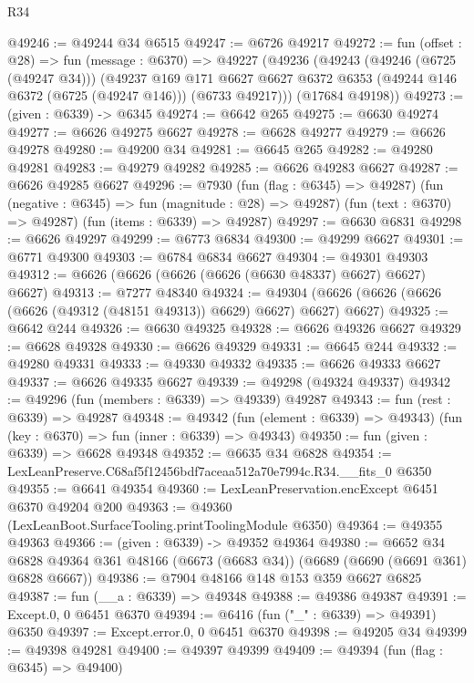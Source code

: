 \begin{lexlean}{R34}
\begin{coremodule}
@49246 := @49244 @34 @6515
@49247 := @6726 @49217
@49272 := fun (offset : @28) =>
  fun (message : @6370) =>
  @49227
    (@49236
      (@49243
        (@49246 (@6725 (@49247 @34)))
        (@49237
          @169
          @171
          @6627
          @6627
          @6372
          @6353
          (@49244 @146 @6372 (@6725 (@49247 @146)))
          (@6733 @49217)))
      (@17684 @49198))
@49273 := (given : @6339) -> @6345
@49274 := @6642 @265
@49275 := @6630 @49274
@49277 := @6626 @49275 @6627
@49278 := @6628 @49277
@49279 := @6626 @49278
@49280 := @49200 @34
@49281 := @6645 @265
@49282 := @49280 @49281
@49283 := @49279 @49282
@49285 := @6626 @49283 @6627
@49287 := @6626 @49285 @6627
@49296 := @7930
    (fun (flag : @6345) => @49287)
    (fun (negative : @6345) => fun (magnitude : @28) => @49287)
    (fun (text : @6370) => @49287)
    (fun (items : @6339) => @49287)
@49297 := @6630 @6831
@49298 := @6626 @49297
@49299 := @6773 @6834
@49300 := @49299 @6627
@49301 := @6771 @49300
@49303 := @6784 @6834 @6627
@49304 := @49301 @49303
@49312 := @6626 (@6626 (@6626 (@6626 (@6630 @48337) @6627) @6627) @6627)
@49313 := @7277 @48340
@49324 := @49304 (@6626 (@6626 (@6626 (@6626 (@49312 (@48151 @49313)) @6629) @6627) @6627) @6627)
@49325 := @6642 @244
@49326 := @6630 @49325
@49328 := @6626 @49326 @6627
@49329 := @6628 @49328
@49330 := @6626 @49329
@49331 := @6645 @244
@49332 := @49280 @49331
@49333 := @49330 @49332
@49335 := @6626 @49333 @6627
@49337 := @6626 @49335 @6627
@49339 := @49298 (@49324 @49337)
@49342 := @49296 (fun (members : @6339) => @49339) @49287
@49343 := fun (rest : @6339) => @49287
@49348 := @49342
    (fun (element : @6339) => @49343)
    (fun (key : @6370) => fun (inner : @6339) => @49343)
@49350 := fun (given : @6339) => @6628 @49348
@49352 := @6635 @34 @6828
@49354 := LexLeanPreserve.C68af5f12456bdf7aceaa512a70e7994c.R34.__fits_0 @6350
@49355 := @6641 @49354
@49360 := LexLeanPreservation.encExcept @6451 @6370 @49204 @200
@49363 := @49360 (LexLeanBoot.SurfaceTooling.printToolingModule @6350)
@49364 := @49355 @49363
@49366 := (given : @6339) -> @49352 @49364
@49380 := @6652
    @34
    @6828
    @49364
    @361
    @48166
    (@6673 (@6683 @34))
    (@6689 (@6690 (@6691 @361) @6828 @6667))
@49386 := @7904 @48166 @148 @153 @359 @6627 @6825
@49387 := fun (__a : @6339) => @49348
@49388 := @49386 @49387
@49391 := Except.{0, 0} @6451 @6370
@49394 := @6416 (fun ("_" : @6339) => @49391) @6350
@49397 := Except.error.{0, 0} @6451 @6370
@49398 := @49205 @34
@49399 := @49398 @49281
@49400 := @49397 @49399
@49409 := @49394
    (fun (flag : @6345) => @49400)

\end{coremodule}
\end{lexlean}
